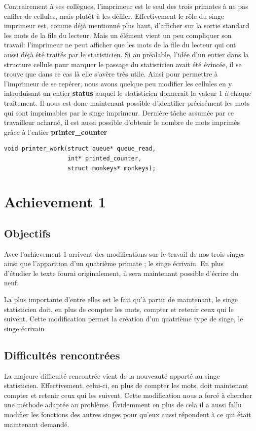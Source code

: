 \documentclass[12pt]{article}
\begin{document}
Contrairement à ses collègues, l'imprimeur est le seul des trois primates à ne pas enfiler de cellules, mais plutôt à les défiler. Effectivement le rôle du singe imprimeur est, comme déjà mentionné plus haut, d'afficher sur la sortie standard les mots de la file du lecteur. Mais un élément vient un peu compliquer son travail: l'imprimeur ne peut afficher que les mots de la file du lecteur qui ont aussi déjà été traités par le statisticien. Si au préalable, l'idée d'un entier dans la structure cellule pour marquer le passage du statisticien avait été évincée, il se trouve que dans ce cas là elle s'avère très utile. Ainsi pour permettre à l'imprimeur de se repérer, nous avons quelque peu modifier les cellules en y introduisant un entier \textbf{status} auquel le statisticien donnerait la valeur 1 à chaque traitement. Il nous est donc maintenant possible d'identifier précisément les mots qui sont imprimables par le singe imprimeur. Dernière tâche assumée par ce travailleur acharné, il est aussi possible d'obtenir le nombre de mots imprimés grâce à l'entier \textbf{printer\_counter}
\bigbreak
\begin{lstlisting}
void printer_work(struct queue* queue_read,
                  int* printed_counter,  
                  struct monkeys* monkeys);

\end{lstlisting}

\newpage
\section{Achievement 1}

\subsection{Objectifs}
Avec l'achievement 1 arrivent des modifications sur le travail de nos trois singes ainsi que l'apparition d'un quatrième primate ; le singe écrivain. En plus d'étudier le texte fourni originalement, il sera maintenant possible d'écrire du neuf.

La plus importante d'entre elles est le fait qu'à partir de maintenant, le singe statisticien doit, en plus de compter les mots, compter et retenir ceux qui le suivent. Cette modification permet la création d'un quatrième type de singe, le singe écrivain

\subsection{Difficultés rencontrées}
La majeure difficulté rencontrée vient de la nouveauté apporté au singe statisticien. Effectivement, celui-ci, en plus de compter les mots, doit maintenant compter et retenir ceux qui les suivent. Cette modification nous a forcé à chercher une 
méthode adaptée au problème. Évidemment en plus de cela il a aussi fallu modifier les fonctions des autres singes pour qu'eux aussi répondent à ce qui était maintenant demandé.
\end{document}
